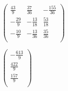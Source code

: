 \documentclass{article}
\begin{document}
\begin{doublespace}
\noindent\(\left(
\begin{array}{ccc}
 \frac{43}{9} & \frac{37}{36} & -\frac{155}{36} \\
 -\frac{29}{9} & -\frac{13}{18} & \frac{53}{18} \\
 -\frac{10}{9} & -\frac{13}{36} & \frac{35}{36} \\
\end{array}
\right)\)
\end{doublespace}

\begin{doublespace}
\noindent\(\left(
\begin{array}{c}
 -\frac{613}{9} \\
 \frac{422}{9} \\
 \frac{157}{9} \\
\end{array}
\right)\)
\end{doublespace}
\end{document}
